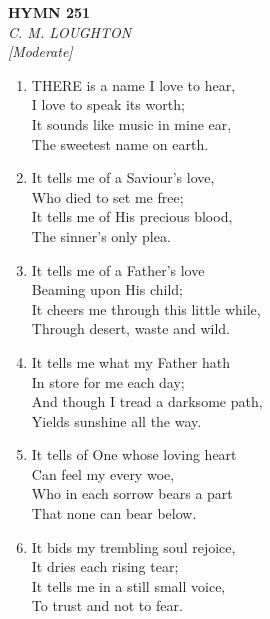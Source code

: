 \documentclass[11pt,a4paper]{article}
\begin{document}
\newpage
\begin{center}
    {\Large \textbf{HYMN 251}}
    \\
    \textit{C. M. LOUGHTON}
    \\
    \textit{\small [Moderate]}
\end{center}
\vspace{1em}

\begin{enumerate}
    \item THERE is a name I love to hear, \\
            I love to speak its worth; \\
        It sounds like music in mine ear, \\
            The sweetest name on earth.

    \item It tells me of a Saviour's love, \\
            Who died to set me free; \\
        It tells me of His precious blood, \\
            The sinner's only plea.

    \item It tells me of a Father's love \\
            Beaming upon His child; \\
        It cheers me through this little while, \\
            Through desert, waste and wild.

    \item It tells me what my Father hath \\
            In store for me each day; \\
        And though I tread a darksome path, \\
            Yields sunshine all the way.

    \item It tells of One whose loving heart \\
            Can feel my every woe, \\
        Who in each sorrow bears a part \\
            That none can bear below.

    \item It bids my trembling soul rejoice, \\
            It dries each rising tear; \\
        It tells me in a still small voice, \\
            To trust and not to fear.


\end{enumerate}
\end{document}
